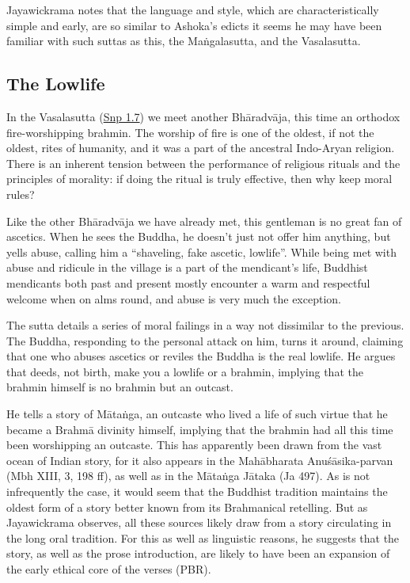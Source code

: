\documentclass[12pt,openany]{book}%
\begin{document}
Jayawickrama notes that the language and style, which are characteristically simple and early, are so similar to Ashoka’s edicts it seems he may have been familiar with such suttas as this, the \textsanskrit{Maṅgalasutta}, and the Vasalasutta.

\subsection*{The Lowlife}

In the Vasalasutta (\href{https://suttacentral.net/snp1.7/en/sujato}{Snp 1.7}) we meet another \textsanskrit{Bhāradvāja}, this time an orthodox fire-worshipping brahmin. The worship of fire is one of the oldest, if not the oldest, rites of humanity, and it was a part of the ancestral Indo-Aryan religion. There is an inherent tension between the performance of religious rituals and the principles of morality: if doing the ritual is truly effective, then why keep moral rules?

Like the other \textsanskrit{Bhāradvāja} we have already met, this gentleman is no great fan of ascetics. When he sees the Buddha, he doesn’t just not offer him anything, but yells abuse, calling him a “shaveling, fake ascetic, lowlife”. While being met with abuse and ridicule in the village is a part of the mendicant’s life, Buddhist mendicants both past and present mostly encounter a warm and respectful welcome when on alms round, and abuse is very much the exception.

The sutta details a series of moral failings in a way not dissimilar to the previous. The Buddha, responding to the personal attack on him, turns it around, claiming that one who abuses ascetics or reviles the Buddha is the real lowlife. He argues that deeds, not birth, make you a lowlife or a brahmin, implying that the brahmin himself is no brahmin but an outcast.

He tells a story of \textsanskrit{Mātaṅga}, an outcaste who lived a life of such virtue that he became a \textsanskrit{Brahmā} divinity himself, implying that the brahmin had all this time been worshipping an outcaste. This has apparently been drawn from the vast ocean of Indian story, for it also appears in the \textsanskrit{Mahābharata} \textsanskrit{Anuśāsika}-parvan (Mbh XIII, 3, 198 ff), as well as in the \textsanskrit{Mātaṅga} \textsanskrit{Jātaka} (Ja 497). As is not infrequently the case, it would seem that the Buddhist tradition maintains the oldest form of a story better known from its Brahmanical retelling. But as Jayawickrama observes, all these sources likely draw from a story circulating in the long oral tradition. For this as well as linguistic reasons, he suggests that the story, as well as the prose introduction, are likely to have been an expansion of the early ethical core of the verses (PBR).
\end{document}
